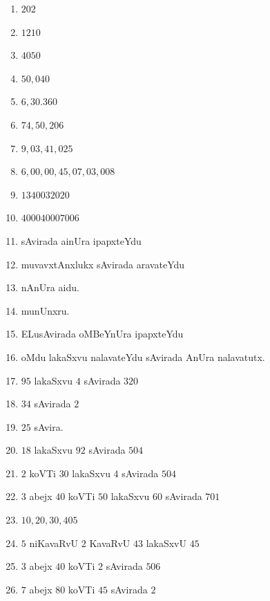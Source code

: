 

\begin{multicols}{2}
\begin{enumerate}[$1.$]
\item $202$
\item $1210$
\item $4050$
\item $50,040$
\item $6,30.360$
\item $74,50,206$
\item $9,03,41,025$
\item $6,00,00,45,07,03,008$
\item $1340032020$
\item $400040007006$
\item sAvirada ainUra ipapxteYdu
\item muvavxtAnxlukx sAvirada aravateYdu
\item nAnUra aidu.
\item munUnxru.
\item ELusAvirada oMBeYnUra ipapxteYdu
\item oMdu lakaSxvu nalavateYdu sAvirada AnUra nalavatutx.
\item $95$ lakaSxvu $4$ sAvirada $320$
\item $34$ sAvirada $2$
\item $25$ sAvira.
\item $18$ lakaSxvu $92$ sAvirada $504$
\item $2$ koVTi $30$ lakaSxvu $4$ sAvirada $504$
\item $3$ abejx $40$ koVTi $50$ lakaSxvu $60$ sAvirada $701$
\item $10,20,30,405$
\item $5$ niKavaRvU $2$ KavaRvU $43$ lakaSxvU $45$
\item $3$ abejx $40$ koVTi $2$ sAvirada $506$
\item $7$ abejx $80$ koVTi $45$ sAvirada $2$
\end{enumerate}
\end{multicols}


